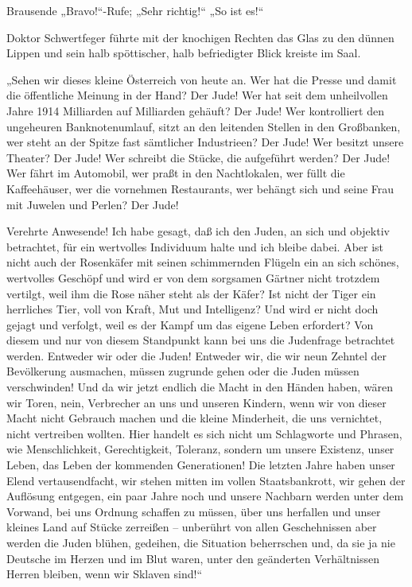 Brausende „Bravo!“-Rufe; „Sehr richtig!“ „So ist
es!“

Doktor Schwertfeger führte mit der knochigen Rechten das Glas zu
den dünnen Lippen und sein halb spöttischer, halb befriedigter
Blick kreiste im Saal.

„Sehen wir dieses kleine Österreich von heute an. Wer hat die
Presse und damit die öffentliche Meinung in der Hand? Der Jude! Wer
hat seit dem unheilvollen Jahre 1914 Milliarden auf Milliarden
gehäuft? Der Jude! Wer kontrolliert den ungeheuren Banknotenumlauf,
sitzt an den leitenden Stellen in den Großbanken, wer steht an der
Spitze fast sämtlicher Industrieen? Der Jude! Wer besitzt unsere
Theater? Der Jude! Wer schreibt die Stücke, die aufgeführt werden?
Der Jude! Wer fährt im Automobil, wer praßt in den Nachtlokalen,
wer füllt die Kaffeehäuser, wer die vornehmen Restaurants, wer
behängt sich und seine Frau mit Juwelen und Perlen? Der Jude!

Verehrte Anwesende! Ich habe gesagt, daß ich den Juden, an sich und
objektiv betrachtet, für ein wertvolles Individuum halte und ich
bleibe dabei. Aber ist nicht auch der Rosenkäfer mit seinen
schimmernden Flügeln ein an sich schönes, wertvolles Geschöpf und
wird er von dem sorgsamen Gärtner nicht trotzdem vertilgt, weil ihm
die Rose näher steht als der Käfer? Ist nicht der Tiger ein
herrliches Tier, voll von Kraft, Mut und Intelligenz? Und wird er
nicht doch gejagt und verfolgt, weil es der Kampf um das eigene
Leben erfordert? Von diesem und nur von diesem Standpunkt kann bei
uns die Judenfrage  betrachtet werden. Entweder wir
oder die Juden! Entweder wir, die wir neun Zehntel der Bevölkerung
ausmachen, müssen zugrunde gehen oder die Juden müssen
verschwinden! Und da wir jetzt endlich die Macht in den Händen
haben, wären wir Toren, nein, Verbrecher an uns und unseren
Kindern, wenn wir von dieser Macht nicht Gebrauch machen und die
kleine Minderheit, die uns vernichtet, nicht vertreiben wollten.
Hier handelt es sich nicht um Schlagworte und Phrasen, wie
Menschlichkeit, Gerechtigkeit, Toleranz, sondern um unsere
Existenz, unser Leben, das Leben der kommenden Generationen! Die
letzten Jahre haben unser Elend vertausendfacht, wir stehen mitten
im vollen Staatsbankrott, wir gehen der Auflösung entgegen, ein
paar Jahre noch und unsere Nachbarn werden unter dem Vorwand, bei
uns Ordnung schaffen zu müssen, über uns herfallen und unser
kleines Land auf Stücke zerreißen – unberührt von allen
Geschehnissen aber werden die Juden blühen, gedeihen, die Situation
beherrschen und, da sie ja nie Deutsche im Herzen und im Blut
waren, unter den geänderten Verhältnissen Herren bleiben, wenn wir
Sklaven sind!“

